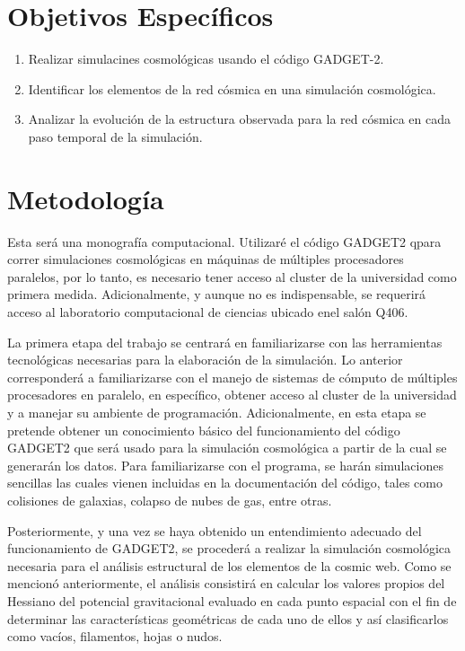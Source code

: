 \documentclass{article}
\begin{document}
\section{Objetivos Específicos}

\begin{enumerate}


\item Realizar simulacines cosmológicas usando el código GADGET-2.
\item Identificar los elementos de la red c\'osmica en una simulaci\'on
  cosmol\'ogica.
\item Analizar la evolución de la estructura observada para la red
  c\'osmica en cada paso temporal de la simulaci\'on. 
\end{enumerate}


\section{Metodología}


Esta será una monografía computacional. Utilizar\'e el código
GADGET2 qpara correr simulaciones cosmológicas en máquinas de
múltiples procesadores paralelos, por lo tanto, es necesario tener
acceso al cluster de la universidad como primera
medida. Adicionalmente, y aunque no es indispensable, se requerirá
acceso al laboratorio computacional de ciencias ubicado enel salón
Q406.  
  
La primera etapa del trabajo se centrará en familiarizarse con las
herramientas tecnológicas necesarias para la elaboración de la
simulación. Lo anterior corresponderá a familiarizarse con el manejo
de sistemas de cómputo de múltiples procesadores en paralelo, en
específico, obtener acceso al cluster de la universidad y a manejar su
ambiente de programación. Adicionalmente, en esta etapa se pretende
obtener un conocimiento básico del funcionamiento del código GADGET2
que será usado para la simulación cosmológica a partir de la cual se
generarán los datos. Para familiarizarse con el programa, se harán
simulaciones sencillas las cuales vienen incluidas en la documentación
del código, tales como colisiones de galaxias, colapso de nubes de
gas, entre otras.  

Posteriormente, y una vez se haya obtenido un entendimiento adecuado
del funcionamiento de GADGET2, se procederá a realizar la simulación
cosmológica necesaria para el análisis estructural de los elementos de
la cosmic web. Como se mencionó anteriormente, el análisis consistirá
en calcular los valores propios del Hessiano del potencial
gravitacional evaluado en cada punto espacial con el fin de determinar
las características geométricas de cada uno de ellos y así
clasificarlos como vacíos, filamentos, hojas o nudos. 
\end{document}
